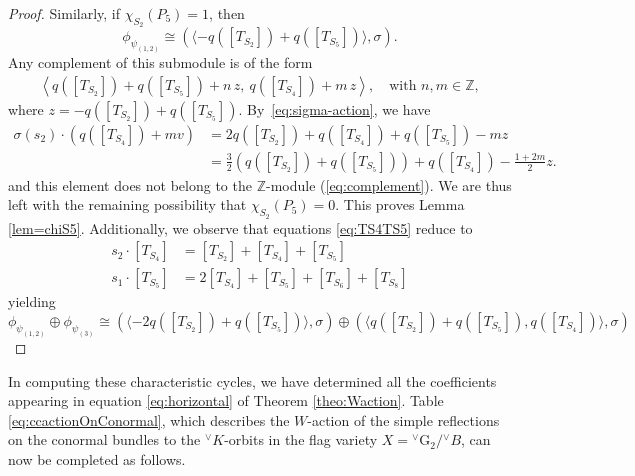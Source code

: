 \documentclass[a4paper, 11pt]{article}
\begin{document}
\begin{proof}
Similarly, if \( \chi_{S_2}(P_5) = 1 \), then
\[
\phi_{\psi_{(1,2)}} \cong 
\left( \langle -q([T_{S_2}]) + q([T_{S_5}]) \rangle, \sigma \right).
\]
Any  complement of this submodule is of the form
\begin{align}\label{eq:complement}
\left\langle 
q([T_{S_2}]) + q([T_{S_5}]) + n\, z,\ 
q([T_{S_4}]) + m\, z 
\right\rangle, \quad \text{with } n, m \in \mathbb{Z},
\end{align}
where \( z = -q([T_{S_2}]) + q([T_{S_5}]) \).
By~\eqref{eq:sigma-action}, we have   
\begin{align*}
\sigma(s_{2})\cdot (q([T_{S_4}])+mv)&=
2q([T_{S_2}])+q([T_{S_4}]) +q([T_{S_5}])-m z\\
&=\frac{3}{2}\left(q([T_{S_2}])+q([T_{S_5}])\right)+q([T_{S_4}])
-\frac{1+2m}{2} z.
\end{align*} 
and this element does not belong to the $\mathbb{Z}$-module
(\ref{eq:complement}).    
We are thus left with the remaining possibility that
$\chi_{S_2}^{}(P_5)=0$.  This proves Lemma \ref{lem=chiS5}.
Additionally, we observe that  equations \eqref{eq:TS4TS5} reduce to
\begin{align*}
s_{2}\cdot [T_{S_4}]&=
[T_{S_2}]+[T_{S_4}]
+[T_{S_5}]\\
s_{1}\cdot [T_{S_5}]&=
2[T_{S_4}]
+[T_{S_5}]+[T_{S_6}] 
 +  [T_{S_8}]
\end{align*}
yielding
\[
\phi_{\psi_{(1,2)}}\oplus \phi_{\psi_{(3)}} \cong 
\left( \langle -2q([T_{S_2}]) + q([T_{S_5}]) \rangle, \sigma \right)\oplus
\left( \langle q([T_{S_2}]) + q([T_{S_5}]), q([T_{S_4}]) \rangle, \sigma \right)
\] 


\end{proof}
In computing these characteristic cycles, we have determined all the
coefficients appearing in equation  \eqref{eq:horizontal} of Theorem
\ref{theo:Waction}. Table  
\ref{eq:ccactionOnConormal}, which
describes the $W$-action of the simple reflections on the conormal
bundles to the ${}^{\vee}K$-orbits in the flag variety $X =
{}^{\vee}\mathrm{G}_{2} / {}^{\vee}B$, can now be completed as follows. 
\end{document}
